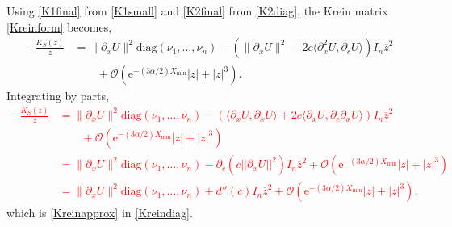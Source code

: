 \documentclass[review,onefignum,onetabnum]{siamart171218}
\newcommand{\rme}{\mathrm{e}}
\newcommand{\vI}{\bm{\mathit{I}}}
\newcommand{\vK}{\bm{\mathit{K}}}
\newcommand{\revised}[1]{ \textcolor{red}{#1} }
\begin{document}
Using \cref{K1final} from \cref{K1small} and \cref{K2final} from \cref{K2diag}, the Krein matrix \cref{Kreinform} becomes,
\[%
\begin{aligned}
-\frac{\vK_S(z)}{z}&= \|\partial_xU\|^2 \text{diag}(\nu_1, \dots, \nu_n)
- ( \|\partial_xU\|^2 -2 c \langle \partial_x^2U, \partial_cU \rangle) \vI_n \overline{z}^2 \\
&\qquad + \mathcal{O}(\rme^{-(3 \alpha/2) X_{\mathrm{min}}}|z| + |z|^3).
\end{aligned}
\]%
Integrating by parts,
\revised{
\[
\begin{aligned}
-\frac{\vK_S(z)}{z}
&= \|\partial_xU\|^2 \text{diag}(\nu_1, \dots, \nu_n) - \left( \langle \partial_xU, \partial_xU \rangle + 2c\langle \partial_xU,\partial_c\partial_xU\rangle \right)\vI_n\overline{z}^2\\
&\qquad + \mathcal{O}(\rme^{-(3 \alpha/2) X_{\mathrm{min}}}|z| + |z|^3)  \\
&= \|\partial_xU\|^2 \text{diag}(\nu_1, \dots, \nu_n) -\partial_c\left( c||\partial_xU||^2 \right) \vI_n \overline{z}^2  + \mathcal{O}(\rme^{-(3 \alpha/2) X_{\mathrm{min}}}|z| + |z|^3) \\
&= \|\partial_xU\|^2 \text{diag}(\nu_1, \dots, \nu_n) + d''(c) \vI_n \overline{z}^2  + \mathcal{O}(\rme^{-(3 \alpha/2) X_{\mathrm{min}}}|z| + |z|^3),
\end{aligned}
\]
}
which is \cref{Kreinapprox} in \cref{Kreindiag}.



%
%
%
\end{document}
